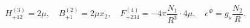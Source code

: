\begin{equation}         \label{eq:IIAm1f}
H^{(3)}_{+12} = 2 \mu, \quad B^{(2)}_{+1} = 2 \mu x_2,
\quad 
F^{(4)}_{+234} = - 4 \pi \frac{N_1}{R^3} \cdot 4 \mu,
\quad
e^{\Phi} = g_s \frac{N_2}{R}.
\end{equation}

